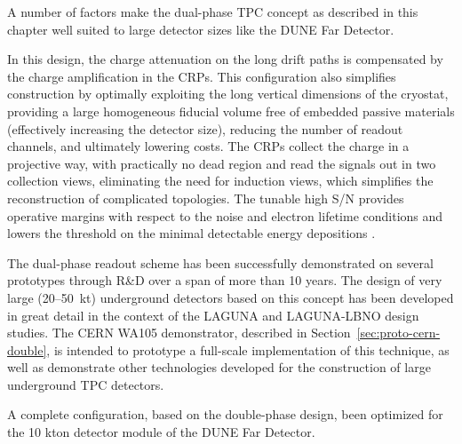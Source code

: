 A number of factors make the dual-phase TPC concept as described in this chapter 
well suited to large detector sizes like the DUNE Far Detector.

In this design, the charge attenuation on the long drift paths is compensated by the
charge amplification in the CRPs.  This configuration also simplifies
construction by optimally exploiting the long vertical dimensions of
the cryostat, providing a large homogeneous fiducial volume 
free of embedded passive materials (effectively increasing the detector size),
reducing the number of readout channels,  and ultimately lowering costs.  
The CRPs collect the charge in a projective way,  with practically no dead region and read the signals out 
in two collection views, eliminating the need for  induction views, which 
simplifies the reconstruction of complicated topologies. The tunable high S/N provides operative margins
with respect to the noise and electron lifetime conditions and lowers the threshold on the minimal
detectable energy depositions .

The dual-phase readout scheme has been successfully demonstrated on
several prototypes through R\&D over a span of more than 10 years.  The
design of very large (20--50~kt) underground detectors based on this
concept has been developed in great detail in the context of the
LAGUNA and LAGUNA-LBNO design studies.  The CERN WA105 demonstrator, 
described in Section~\ref{sec:proto-cern-double}, is intended to prototype 
a full-scale implementation of this technique, as
well as demonstrate other technologies developed for the construction of large
underground TPC detectors.  

 A complete configuration, based on the double-phase design, been optimized for the 10 kton
detector module of the DUNE Far Detector.
